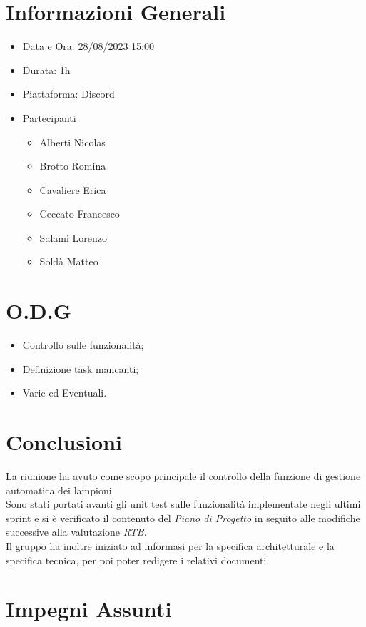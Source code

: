\documentclass[a4paper, 12pt]{article}
\begin{document}
\makefrontpage

\section*{Informazioni Generali}
\begin{itemize}
    \item Data e Ora: 28/08/2023 15:00
    \item Durata: 1h
    \item Piattaforma: Discord
    \item Partecipanti
    \begin{itemize}
        \item Alberti Nicolas
        \item Brotto Romina
        \item Cavaliere Erica
        \item Ceccato Francesco
        \item Salami Lorenzo
        \item Soldà Matteo
    \end{itemize}
\end{itemize}

\section*{O.D.G}
\begin{itemize}
    \item Controllo sulle funzionalità;
    \item Definizione task mancanti;
    \item Varie ed Eventuali.
\end{itemize}

\section*{Conclusioni}
La riunione ha avuto come scopo principale il controllo della funzione di gestione automatica dei lampioni. \\
Sono stati portati avanti gli unit test sulle funzionalità implementate negli ultimi sprint e si è verificato il contenuto del \textit{Piano di Progetto} in seguito alle modifiche successive alla valutazione \textit{RTB}.\\
Il gruppo ha inoltre iniziato ad informasi per la specifica architetturale e la specifica tecnica, per poi poter redigere i relativi documenti.

\section*{Impegni Assunti}
\end{document}
